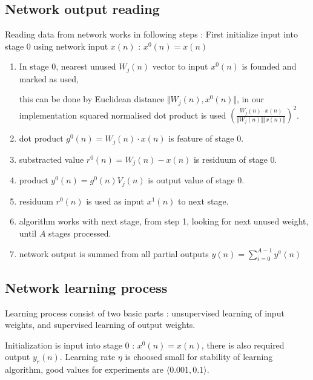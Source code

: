 \documentclass[10pt,a4paper]{article}
\begin{document}
\subsection{Network output reading}
Reading data from network works in following steps :
First initialize input into stage 0 using network input $x(n)$  : $x^0(n) = x(n)$

\begin{enumerate}
\item In stage 0, nearest unused $W_j(n)$ vector to input $x^0(n)$ is founded and marked as used,

  this can be done by Euclidean distance $\Vert W_j(n), x^0(n) \Vert$, in our implementation
  squared normalised dot product is used $(\frac{W_j(n) \cdot x(n)}{\Vert W_j(n) \Vert \Vert x(n)\Vert} )^2$.
\item dot product $g^0(n) = W_j(n) \cdot x(n)$ is feature of stage 0.
\item substracted value  $r^0(n) = W_j(n) - x(n)$ is residuum of stage 0.
\item product $y^0(n) = g^0(n)V_j(n)$ is output value of stage 0.
\item residuum $r^0(n)$ is used as input $x^1(n)$ to next stage.
\item algorithm works with next stage, from step 1, looking for next unused weight, until $A$ stages processed.
\item network output is summed from all partial outputs $y(n) = \sum_{i = 0}^{A-1} y^a(n)$

\end{enumerate}


\subsection{Network learning process}
Learning process consist of two basic parts : unsupervised learning of input weights,
and supervised learning of output weights.

Initialization is input into stage 0 : $x^0(n) = x(n)$, there is also
required output $y_r(n)$. Learning rate $\eta$ is choosed small for stability of
learning algorithm, good values for experiments are $\langle 0.001 , 0.1 \rangle$.
\end{document}
